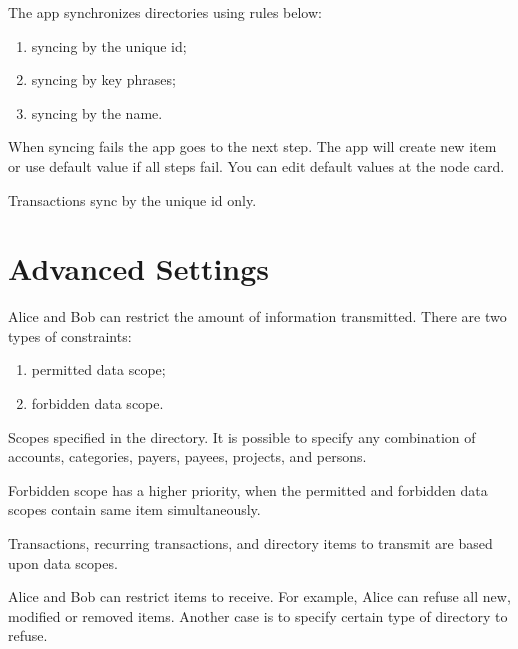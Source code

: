 \documentclass[a4paper,10pt,english]{sphinxmanual}
\begin{document}
\sphinxAtStartPar
The app synchronizes directories using rules below:
\begin{enumerate}
%
\item {} 
\sphinxAtStartPar
syncing by the unique id;

\item {} 
\sphinxAtStartPar
syncing by key phrases;

\item {} 
\sphinxAtStartPar
syncing by the name.

\end{enumerate}

\sphinxAtStartPar
When syncing fails the app goes to the next step. The app will create new item or use default value
if all steps fail. You can edit default values at the node card.

\sphinxAtStartPar
Transactions sync by the unique id only.


\section{Advanced Settings}
\label{\detokenize{teamwork:advanced-settings}}
\sphinxAtStartPar
Alice and Bob can restrict the amount of information transmitted. There are two types of constraints:
\begin{enumerate}
%
\item {} 
\sphinxAtStartPar
permitted data scope;

\item {} 
\sphinxAtStartPar
forbidden data scope.

\end{enumerate}

\sphinxAtStartPar
Scopes specified in the  directory. It is possible to specify any combination of accounts,
categories, payers, payees, projects, and persons.

\sphinxAtStartPar
Forbidden scope has a higher priority, when the permitted and forbidden data scopes contain
same item simultaneously.

\sphinxAtStartPar
Transactions, recurring transactions, and directory items to transmit are based upon data scopes.

\sphinxAtStartPar
Alice and Bob can restrict items to receive. For example, Alice can refuse all new, modified
or removed items. Another case is to specify certain type of directory to refuse.
\end{document}
